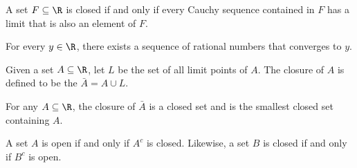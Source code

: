 \begin{tcolorbox}
\begin{thm}
A set \( F \subseteq \R \) is closed if and only if every Cauchy sequence contained in \( F \) has a limit that is also an element of \( F \). 
\end{thm}
\end{tcolorbox}

\begin{tcolorbox}
\begin{thm}
For every \( y \in \R  \), there exists a sequence of rational numbers that converges to \( y \). 
\end{thm}
\end{tcolorbox}

\begin{tcolorbox}
\begin{defn}
    Given a set \( A \subseteq \R  \), let \( L \) be the set of all limit points of \( A \). The closure of \( A \) is defined to be the \( \bar{A} = A \cup L \). 
\end{defn}
\end{tcolorbox}


\begin{tcolorbox}
\begin{thm}
    For any \( A \subseteq \R  \), the closure of \( \bar{A} \) is a closed set and is the smallest closed set containing \( A \). 
\end{thm}
\end{tcolorbox}

\begin{tcolorbox}
\begin{thm}
A set \( A \) is open if and only if \( A^c \) is closed. Likewise, a set \( B \) is closed if and only if \( B^c \) is open. 
\end{thm}
\end{tcolorbox}


